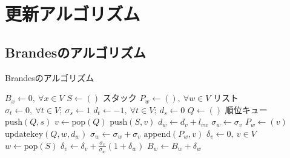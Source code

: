 \chapter{更新アルゴリズム}
\label{chap:app-algorithm}

\section{Brandesのアルゴリズム}
\label{sect:app-brandes-algorithm}
\begin{algorithm}[H]
  \caption{Brandesのアルゴリズム}
  \label{algo:brandes}
  \begin{multicols}{2}
    \begin{algorithmic}[1]
      \State $B_x\gets 0,\:\forall x\in V$
      \State $S\gets()$ \Comment スタック
      \State $P_w\gets (),\:\forall w\in V$ \Comment リスト
      \State $\sigma_t\gets 0,\:\forall t\in V;\:\sigma_s\gets 1$
      \State $d_t\gets -1,\:\forall t\in V;\:d_s\gets 0$
      \State $Q\gets ()$ \Comment 順位キュー
      \State $\mathrm{push}(Q, s)$
      \State $v\gets\mathrm{pop}(Q)$
      \State $\mathrm{push}(S, v)$
      \State $d_w\gets d_v+l_{vw}$
      \State $\sigma_w\gets\sigma_v$
      \State $P_w\gets(v)$
      \State $\mathrm{updatekey}(Q, w, d_w)$
      \EndIf
      \State $\sigma_w\gets\sigma_w+\sigma_v$
      \State $\mathrm{append}(P_w, v)$
      \EndIf
      \EndFor
      \EndWhile
      \State $\delta_v\gets 0,\:v\in V$
      \State $w\gets\mathrm{pop}(S)$
      \State $\delta_v\gets\delta_v+\frac{\sigma_v}{\sigma_w}(1+\delta_w)$
      \EndFor
      \State $B_w\gets B_w+\delta_w$
      \EndIf
      \EndWhile
      \EndFor
      \EndProcedure
    \end{algorithmic}
  \end{multicols}
\end{algorithm}

